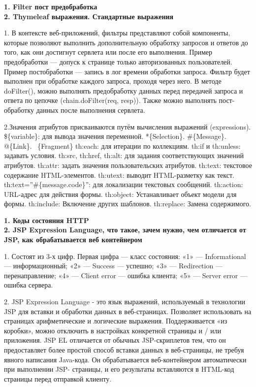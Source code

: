 \documentclass{article}
\begin{document}
\hfill
\begin{minipage}{.3\textwidth}
    \textbf{1. Filter пост предобработка}\\
    \textbf{2. Thymeleaf выражения. Стандартные выражения}

1. В контексте веб-приложений, фильтры представляют собой компоненты, которые позволяют выполнить дополнительную обработку запросов и ответов до того, как они достигнут сервлета или после его выполнения. 
Пример предобработки — допуск к странице только авторизованных пользователей.
Пример постобработки — запись в лог времени обработки запроса.
Фильтр будет выполнен при обработке каждого запроса, проходя через него. В методе doFilter(), можно выполнять предобработку данных перед передачей запроса и ответа по цепочке (chain.doFilter(req, resp)). Также можно выполнять пост-обработку данных после выполнения сервлета.

2.Значения атрибутов присваиваются путём вычисления
выражений (expressions). \$\{variable\}: для вывода значения переменной. *\{Selection\}. \#\{Message\}. @\{Link\}. ~\{Fragment\}
th:each: для итерации по коллекциям. th:if и th:unless: задавать условия. th:src, th:href, th:alt: для задания соответствующих значений атрибутов. th:attr: задать значения пользовательских атрибутов.
th:text: текстовое содержание HTML-элементов. th:utext: выводит HTML-разметку как текст.
th:text=”\#\{message.code\}”: для локализации текстовых сообщений.
th:action: URL-адрес для действия формы. th:object: Устанавливает объект модели для формы.
th:include: Включение других шаблонов. th:replace: Замена содержимого.
\end{minipage}
\hfill
\begin{minipage}{.3\textwidth}
    \textbf{1. Коды состояния HTTP}\\
    \textbf{2. JSP Expression Language, что такое, зачем нужно, чем отличается от JSP, как обрабатывается веб контейнером}

1. Состоят из 3-х цифр.
Первая цифра — класс состояния:
«1» — Informational — информационный; «2» — Success — успешно;
«3» — Redirection — перенаправление; «4» — Client error — ошибка клиента;
«5» — Server error — ошибка сервера.

2. JSP Expression Language - это язык выражений, используемый в технологии JSP для вставки и обработки данных в веб-страницах. 
Позволяет использовать на страницах арифметические и логические выражения.
Поддерживается «из коробки», можно отключить в настройках конкретной страницы и / или приложения.
JSP EL отличается от обычных JSP-скриплетов тем, что он предоставляет более простой способ вставки данных в веб-страницы, не требуя явного написания Java-кода. Он обрабатывается веб-контейнером автоматически при выполнении JSP- страницы, и его результаты вставляются в HTML-код страницы перед отправкой клиенту.
\end{minipage}
\end{document}
